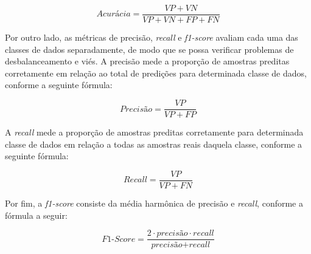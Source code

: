 \begin{center}
  \[
  \textit{Acurácia} = \frac{VP + VN}{VP + VN + FP + FN}
  \]
\end{center}

Por outro lado, as métricas de precisão, \textit{recall} e \textit{f1-score} avaliam cada uma das classes de dados separadamente, de modo que se possa verificar problemas de desbalanceamento e viés. A precisão mede a proporção de amostras preditas corretamente em relação ao total de predições para determinada classe de dados, conforme a seguinte fórmula:

\begin{center}
  \[
  \textit{Precisão} = \frac{VP}{VP + FP}
  \]
\end{center}

A \textit{recall} mede a proporção de amostras preditas corretamente para determinada classe de dados em relação a todas as amostras reais daquela classe, conforme a seguinte fórmula:

\begin{center}
  \[
  \textit{Recall} = \frac{VP}{VP + FN}
  \]
\end{center}

Por fim, a \textit{f1-score} consiste da média harmônica de precisão e \textit{recall}, conforme a fórmula a seguir:

\begin{center}
  \[
  \textit{F1-Score} = \frac{2 \cdot \textit{precisão} \cdot \textit{recall}}{\textit{precisão} + \textit{recall}}
  \]
\end{center}

